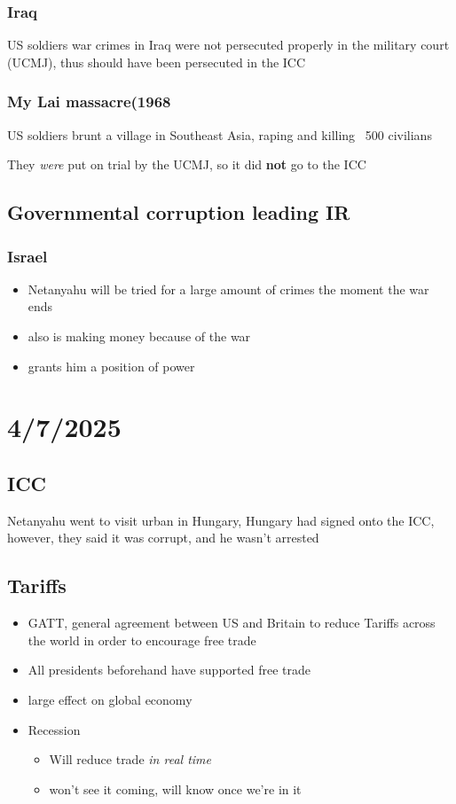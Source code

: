 \documentclass{article}
\begin{document}
\subsubsection{Iraq}

US soldiers war crimes in Iraq were not persecuted properly in the military court (UCMJ), thus should have been persecuted in the ICC

\subsubsection{My Lai massacre(1968}
US soldiers brunt a village in Southeast Asia, raping and killing ~500 civilians

They \textit{were} put on trial by the UCMJ, so it did \textbf{not} go to the ICC

\subsection{Governmental corruption leading IR}
\subsubsection{Israel}
\begin{itemize}

    \item Netanyahu will be tried for a large amount of crimes the moment the war ends
    \item also is making money because of the war
    \item grants him a position of power

\end{itemize}

\section{4/7/2025}
    \subsection{ICC}
    Netanyahu went to visit urban in Hungary, Hungary had signed onto the ICC, however, they said it was corrupt, and he wasn't arrested

    \subsection{Tariffs}
    \begin{itemize}
        \item GATT, general agreement between US and Britain to reduce Tariffs across the world in order to encourage free trade
        \item All presidents beforehand have supported free trade  
        \item large effect on global economy 
        \item Recession \begin{itemize}
            \item Will reduce trade \textit{in real time}
            \item won't see it coming, will know once we're in it 
        \end{itemize}
    \end{itemize}
\end{document}
